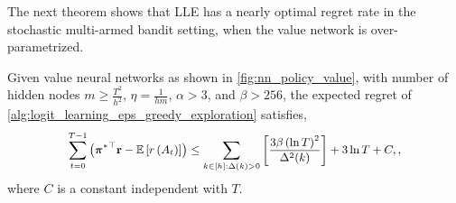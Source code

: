 The next theorem shows that LLE has a nearly optimal regret rate in the stochastic multi-armed bandit setting, when the value network is over-parametrized.
\begin{thm}
\label{thm:logit_learning_main_result}
    Given value neural networks as shown in \cref{fig:nn_policy_value}, with number of hidden nodes $m \ge \frac{T^2}{h^2}$, $\eta = \frac{1}{h m}$,  $\alpha > 3$, and $\beta > 256$, the expected regret of \cref{alg:logit_learning_eps_greedy_exploration} satisfies,
\begin{equation*}
\small
\begin{split}
    \sum\limits_{t=0}^{T-1}{ \left( {\rvpi^*}^\top \rvr - \sE \left[ r\left(A_t\right) \right] \right)} \le \sum\limits_{k \in [h] : \Delta(k) > 0}{ \left[ \frac{ 3 \beta \left( \ln{T} \right)^2}{\Delta^2(k)} \right] }  + 3 \ln{T} + C,,
\end{split}
\end{equation*}
where $C$ is a constant independent with $T$.
\end{thm}

